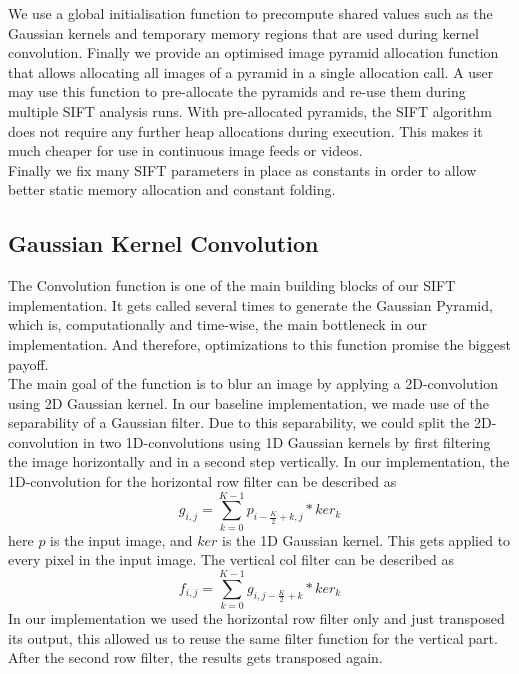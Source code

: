 \documentclass[letterpaper]{article}
\begin{document}
We use a global initialisation function to precompute shared values such as the Gaussian kernels and temporary memory regions that are used during kernel convolution. Finally we provide an optimised image pyramid allocation function that allows allocating all images of a pyramid in a single allocation call. A user may use this function to pre-allocate the pyramids and re-use them during multiple SIFT analysis runs. With pre-allocated pyramids, the SIFT algorithm does not require any further heap allocations during execution. This makes it much cheaper for use in continuous image feeds or videos. \\

Finally we fix many SIFT parameters in place as constants in order to allow better static memory allocation and constant folding.


\subsection*{Gaussian Kernel Convolution}
The Convolution function is one of the main building blocks of our SIFT implementation. It gets called several times to generate the Gaussian Pyramid, which is, computationally and time-wise, the main bottleneck in our implementation. And therefore, optimizations to this function promise the biggest payoff. \\

The main goal of the function is to blur an image by applying a 2D-convolution using 2D Gaussian kernel. In our baseline implementation, we made use of the separability of a Gaussian filter. Due to this separability, we could split the 2D-convolution in two 1D-convolutions using 1D Gaussian kernels by first filtering the image horizontally and in a second step vertically. In our implementation, the 1D-convolution for the horizontal row filter can be described as
\begin{equation}\label{eq_h}
    g_{i,j} = \sum_{k=0}^{K-1} p_{i-\frac{K}{2}+k,j} * ker_{k}
\end{equation}
here $p$ is the input image, and $ker$ is the 1D Gaussian kernel. This gets applied to every pixel in the input image. The vertical col filter can be described as
\begin{equation}\label{eq_v}
    f_{i,j} = \sum_{k=0}^{K-1} g_{i,j-\frac{K}{2}+k} * ker_{k}
\end{equation}
In our implementation we used the horizontal row filter only and just transposed its output, this allowed us to reuse the same filter function for the vertical part. After the second row filter, the results gets transposed again.\\
\end{document}

